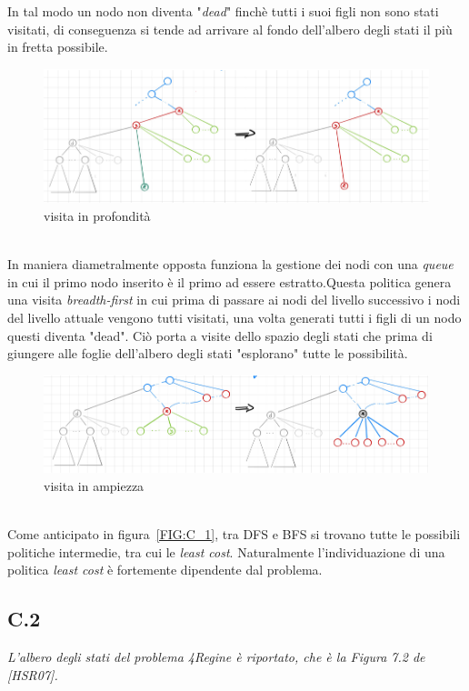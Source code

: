 \documentclass[a4paper]{article}
\begin{document}
In tal modo un nodo non diventa "\emph{dead}" finchè tutti i suoi figli non sono stati visitati, di conseguenza si tende ad arrivare al fondo dell'albero degli stati il più in fretta possibile.
\begin{figure}[!ht]
\centering
\includegraphics[width=1\textwidth]{./img/C_1_DFS.png}
\caption{visita in profondità} \label{FIG:C_1_DFS}
\end{figure}\\
In maniera diametralmente opposta funziona la gestione dei nodi con una \emph{queue} in cui il primo nodo inserito è il primo ad essere estratto.Questa politica genera una visita \textit{breadth-first} in cui prima di passare ai nodi del livello successivo i nodi del livello attuale vengono tutti visitati, una volta generati tutti i figli di un nodo questi diventa "dead".
Ciò porta a visite dello spazio degli stati che prima di giungere alle foglie dell'albero degli stati "esplorano" tutte le possibilità.
\begin{figure}[!ht]
\centering
\includegraphics[width=1\textwidth]{./img/C_1_BFS.png}
\caption{visita in ampiezza} \label{FIG:C_1_BFS}
\end{figure}\\
Come anticipato in figura~\ref{FIG:C_1}, tra DFS e BFS si trovano tutte le possibili politiche intermedie, tra cui le \textit{least cost}. Naturalmente l'individuazione di una politica \textit{least cost} è fortemente dipendente dal problema.
\subsection{C.2}
\emph{L’albero degli stati del problema 4Regine è riportato, che è la Figura 7.2 de [HSR07].}\\
\end{document}
